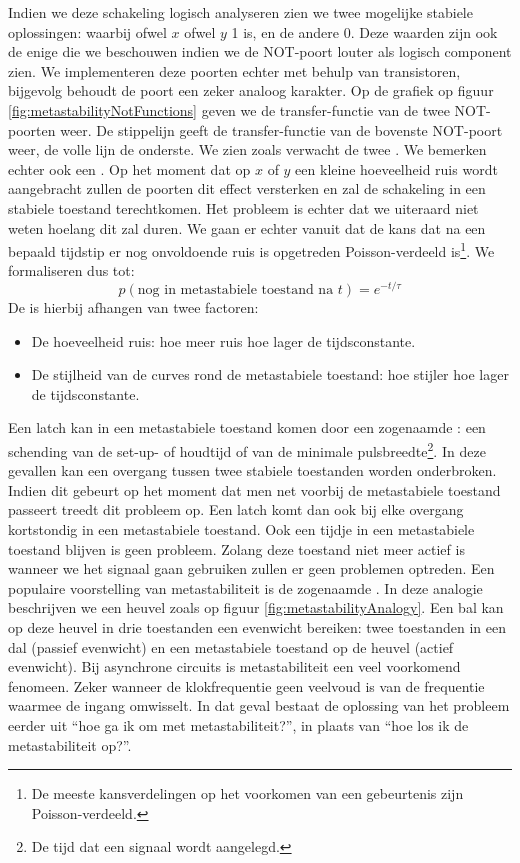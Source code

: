 Indien we deze schakeling logisch analyseren zien we twee mogelijke stabiele oplossingen: waarbij ofwel $x$ ofwel $y$ 1 is, en de andere 0. Deze waarden zijn ook de enige die we beschouwen indien we de NOT-poort louter als logisch component zien. We implementeren deze poorten echter met behulp van transistoren, bijgevolg behoudt de poort een zeker analoog karakter. Op de grafiek op figuur \ref{fig:metastabilityNotFunctions} geven we de transfer-functie van de twee NOT-poorten weer. De stippelijn geeft de transfer-functie van de bovenste NOT-poort weer, de volle lijn de onderste. We zien zoals verwacht de twee . We bemerken echter ook een . Op het moment dat op $x$ of $y$ een kleine hoeveelheid ruis wordt aangebracht zullen de poorten dit effect versterken en zal de schakeling in een stabiele toestand terechtkomen. Het probleem is echter dat we uiteraard niet weten hoelang dit zal duren. We gaan er echter vanuit dat de kans dat na een bepaald tijdstip er nog onvoldoende ruis is opgetreden Poisson-verdeeld is\footnote{De meeste kansverdelingen op het voorkomen van een gebeurtenis zijn Poisson-verdeeld.}. We formaliseren dus tot:
\begin{equation}
p\left(\mbox{nog in metastabiele toestand na $t$}\right)=e^{-t/\tau}
\end{equation}
De  is hierbij afhangen van twee factoren:
\begin{itemize}
 \item De hoeveelheid ruis: hoe meer ruis hoe lager de tijdsconstante.
 \item De stijlheid van de curves rond de metastabiele toestand: hoe stijler hoe lager de tijdsconstante.
\end{itemize}
Een latch kan in een metastabiele toestand komen door een zogenaamde : een schending van de set-up- of houdtijd of van de minimale pulsbreedte\footnote{De tijd dat een signaal wordt aangelegd.}. In deze gevallen kan een overgang tussen twee stabiele toestanden worden onderbroken. Indien dit gebeurt op het moment dat men net voorbij de metastabiele toestand passeert treedt dit probleem op. Een latch komt dan ook bij elke overgang kortstondig in een metastabiele toestand. Ook een tijdje in een metastabiele toestand blijven is geen probleem. Zolang deze toestand niet meer actief is wanneer we het signaal gaan gebruiken zullen er geen problemen optreden. Een populaire voorstelling van metastabiliteit is de zogenaamde . In deze analogie beschrijven we een heuvel zoals op figuur \ref{fig:metastabilityAnalogy}. Een bal kan op deze heuvel in drie toestanden een evenwicht bereiken: twee toestanden in een dal (passief evenwicht) en een metastabiele toestand op de heuvel (actief evenwicht). Bij asynchrone circuits is metastabiliteit een veel voorkomend fenomeen. Zeker wanneer de klokfrequentie geen veelvoud is van de frequentie waarmee de ingang omwisselt. In dat geval bestaat de oplossing van het probleem eerder uit ``hoe ga ik om met metastabiliteit?'', in plaats van ``hoe los ik de metastabiliteit op?''.
